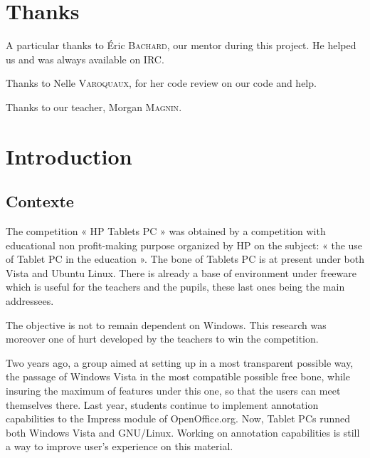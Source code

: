 \documentclass[a4paper,11pt]{article}
\begin{document}
\newpage
\tableofcontents

\newpage

\setcounter{page}{1}
\fancyfoot[C]{\thepage}
\section*{Thanks}
A particular thanks to Éric \textsc{Bachard}, our mentor during this project. He helped us and was always available on IRC.

Thanks to Nelle \textsc{Varoquaux}, for her code review on our code and help.

Thanks to our teacher, Morgan \textsc{Magnin}.

\newpage

\fancyfoot[C]{\thepage}
\section*{Introduction}

\subsection*{Contexte}

The competition « HP Tablets PC » was obtained by a competition with educational non profit-making purpose organized by HP on the subject: « the use of Tablet PC in the education ». The bone of Tablets PC is at present under both Vista and Ubuntu Linux. There is already a base of environment under freeware which is useful for the teachers and the pupils, these last ones being the main addressees.

The objective is not to remain dependent on Windows. This research was moreover one of hurt developed by the teachers to win the competition.

Two years ago, a group aimed at setting up in a most transparent possible way, the passage of Windows Vista in the most compatible possible free bone, while insuring the maximum of features under this one, so that the users can meet themselves there. Last year, students continue to implement annotation capabilities to the Impress module of OpenOffice.org. Now, Tablet PCs runned both Windows Vista and GNU/Linux. Working on annotation capabilities is still a way to improve user's experience on this material.
\end{document}
